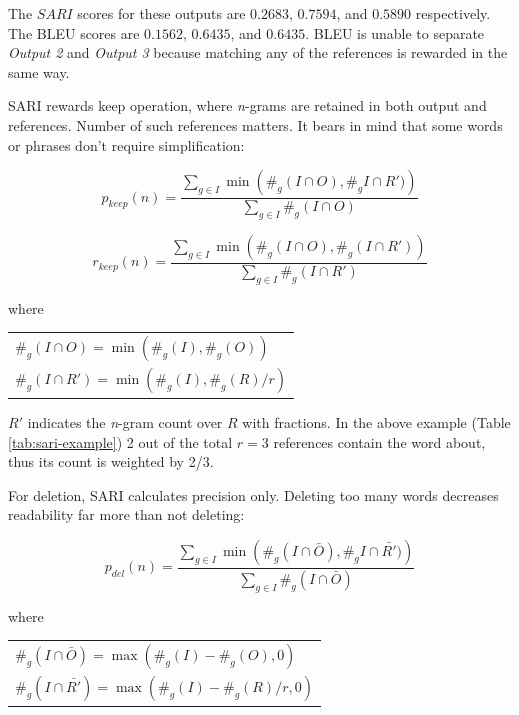 \bigskip
The $SARI$ scores for these outputs are $0.2683$, $0.7594$, and $0.5890$ respectively. The BLEU scores are $0.1562$, $0.6435$, and $0.6435$. BLEU is unable to separate \textit{Output 2} and \textit{Output 3} because matching any of the references is rewarded in the same way.

SARI rewards keep operation, where \textit{n}-grams are retained in both output and references. Number of such references matters. It bears in mind that some words or phrases don't require simplification:

\begin{equation}
p_{keep}(n)=\frac{\sum_{g \in I} \min \left(\#_{g}(I \cap O), \#_{g}I \cap R')\right)}{\sum_{g \in I} \#_{g}(I \cap O)} 
\end{equation}

\begin{equation}
r_{keep}(n) =\frac{\sum_{g \in I} \min \left(\#_{g}(I \cap O), \#_{g}(I \cap R')\right)}{\sum_{g \in I} \#_{g}(I \cap R')} 
\end{equation}

where

\setlength\extrarowheight{10pt}
\hspace*{3em}
\begin{tabular}{l}
$\#_{g}(I \cap O)=\min \left(\#_{g}(I), \#_{g}(O)\right)$ \\
$\#_{g}(I \cap R')=\min \left(\#_{g}(I), \#_{g}(R)/r\right)$
\end{tabular}

\bigskip
$R'$ indicates the \textit{n}-gram count over $R$ with fractions. In the above example (Table \ref{tab:sari-example}) 2 out of the total $r=3$ references contain the word {\selectfont  about}, thus its count is weighted by 2/3.

For deletion, SARI calculates precision only. Deleting too many words decreases readability far more than not deleting:

\begin{equation}
p_{del}(n)=\frac{\sum_{g \in I} \min \left(\#_{g}(I \cap \bar{O}), \#_{g}I \cap \bar{R'})\right)}{\sum_{g \in I} \#_{g}(I \cap \bar{O})} 
\end{equation}

where

\setlength\extrarowheight{10pt}
\hspace*{3em}
\begin{tabular}{l}
$\#_{g}(I \cap \bar{O})=\max \left(\#_{g}(I) - \#_{g}(O), 0\right) $ \\
$\#_{g}(I \cap \bar{R'})=\max \left(\#_{g}(I) - \#_{g}(R)/r, 0\right)$
\end{tabular}

